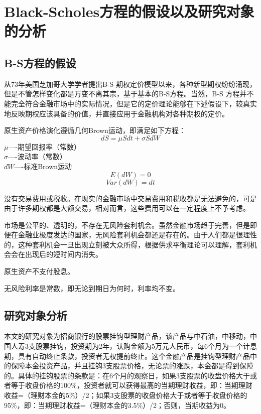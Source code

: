 \chapter{Black-Scholes方程的假设以及研究对象的分析}

\section{B-S方程的假设}
从73年美国芝加哥大学学者提出B-S 期权定价模型以来，各种新型期权纷纷涌现，但是不管怎样变化都是万变不离其宗，基于基本的B-S方程。当然，B-S 方程并不能完全符合金融市场中的实际情况，但是它的定价理论能够在下述假设下，较真实地反映期权应该具备的价值，并直接应用于金融机构对各种期权的定价。
\begin{tjuhypothsis}
	原生资产价格演化遵循几何Brown运动，即满足如下方程：
	\begin{displaymath}
		dS=\mu Sdt+\sigma SdW
	\end{displaymath}
	$\mu$----期望回报率（常数）\\
	$\sigma$----波动率（常数）\\
	$dW$----标准Brown运动
	\begin{displaymath}
		E(dW)=0
	\end{displaymath}
	$$ Var(dW)=dt $$
\end{tjuhypothsis}
\begin{tjuhypothsis}
	没有交易费用或税收。在现实的金融市场中交易费用和税收都是无法避免的，可是由于许多期权都是大额交易，相对而言，这些费用可以在一定程度上不予考虑。
\end{tjuhypothsis}
\begin{tjuhypothsis}
	市场是公平的、透明的，不存在无风险套利机会。虽然金融市场趋于完善，但是即便在金融业极度发达的国家，无风险套利机会都还是存在的。由于人们都是很理性的，这种套利机会一旦出现立刻被大众所得，根据供求平衡理论可以理解，套利机会会在出现后的短时间内消失。
\end{tjuhypothsis}
\begin{tjuhypothsis}
	原生资产不支付股息。
\end{tjuhypothsis}
\begin{tjuhypothsis}
	无风险利率是常数，即无论到期日为何时，利率均不变。
\end{tjuhypothsis}

\section{研究对象分析}
本文的研究对象为招商银行的股票挂钩型理财产品，该产品与中石油，中移动，中国人寿3支股票挂钩，投资期为2年，认购金额为5万元人民币，每6个月为一个计息期，具有自动终止条款，投资者无权提前终止。这个金融产品是挂钩型理财产品中的保障本金投资产品，并且挂钩3支股票价格，无论票的涨跌，本金都是得到保障的。具体的挂钩股票的条款是：在6个月的观察日，如果3支股票的收盘价格大于或者等于收盘价格的100\%，投资者就可以获得最高的当期理财收益，即：当期理财收益=（理财本金的5\%）/2；如果3支股票的收盘价格大于或者等于收盘价格的95\%，即：当期理财收益=（理财本金的3.5\%）/2；否则，当期收益为0。

